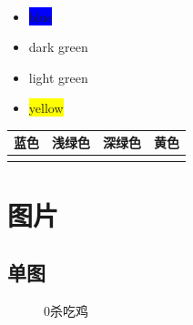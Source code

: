\documentclass[12pt, a4paper, oneside]{ctexart}
\begin{document}
\begin{table}[htbp]
    \centering  %
    \caption{ }  %
    \label{tab333}  %
    \begin{tabular}{|c|c|}
    \end{tabular}
\end{table}

\begin{itemize}
    \item \colorbox{blue}{blue}
    \item \colorbox{dark_green}{dark green}
    \item \colorbox{light_green}{light green}
    \item \colorbox{yellow}{yellow}
\end{itemize}


\begin{table}[htbp]
    \centering
    \begin{tabular}{cccc}
        \toprule
        \textbf{蓝色}      & \textbf{浅绿色}            & \textbf{深绿色}           & \textbf{黄色}        \\
        \midrule
        \cellcolor{blue} & \cellcolor{light_green} & \cellcolor{dark_green} & \cellcolor{yellow} \\
        \bottomrule
    \end{tabular}
\end{table}


\newpage

\section{图片}
\subsection{单图}
\begin{figure} [htbp!]

    \caption{0杀吃鸡}
    \label{fig1}
\end{figure}
\end{document}
